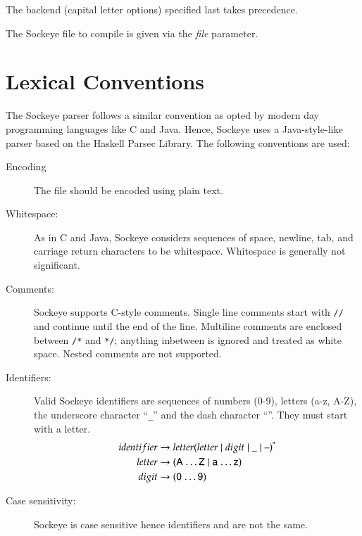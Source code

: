 \documentclass[a4paper,11pt,twoside]{report}
\begin{document}
{{{The backend (capital letter options) specified last takes precedence.

The Sockeye file to compile is given via the \textit{file} parameter.


\chapter{Lexical Conventions}
\label{chap:lexer}

The Sockeye parser follows a similar convention as opted by modern day 
programming languages like C and Java. Hence, Sockeye uses a Java-style-like
parser based on the Haskell Parsec Library. The following conventions are used:

\begin{description}
\item[Encoding] The file should be encoded using plain text.
\item[Whitespace:]  As in C and Java, Sockeye considers sequences of
  space, newline, tab, and carriage return characters to be
  whitespace.  Whitespace is generally not significant. 

\item[Comments:] Sockeye supports C-style comments.  Single line comments
  start with \texttt{//} and continue until the end of the line.
  Multiline comments are enclosed between \texttt{/*} and \texttt{*/};
  anything inbetween is ignored and treated as white space.
  Nested comments are not supported.

\item[Identifiers:] Valid Sockeye identifiers are sequences of numbers
  (0-9), letters (a-z, A-Z), the underscore character ``\texttt{\_}'' and the dash character ``\textendash''. They
  must start with a letter.
  \begin{align*}
  identifier & \rightarrow letter (letter \mid digit \mid \text{\_} \mid \text{\textendash})^{\textrm{*}} \\
  letter & \rightarrow (\textsf{A \ldots Z} \mid  \textsf{a \ldots z})\\
  digit & \rightarrow (\textsf{0 \ldots 9})
	\end{align*}

\item[Case sensitivity:] Sockeye is case sensitive hence identifiers  and  are not the same.
  

\end{description}}}}
\end{document}
